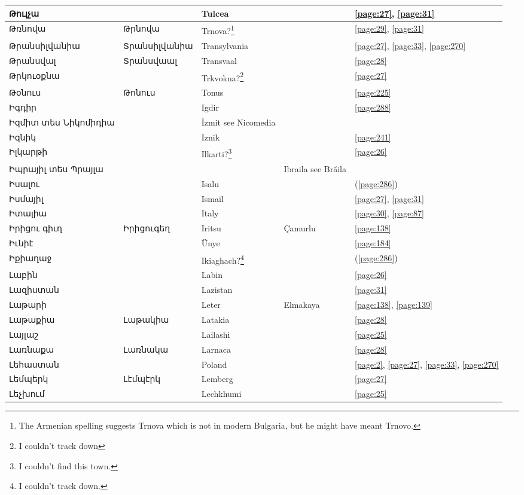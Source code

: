 \begin{center}
\begin{longtable}{|p{}|p{3cm}|p{3cm}|p{2cm}|p{3cm}|}
Թուլչա& & Tulcea& &\ref{page:27}, \ref{page:31}\\ \hline
Թռնովա& Թրնովա & Trnova?\footnote{The Armenian spelling suggests Trnova which is not in modern Bulgaria, but he might have meant Trnovo.}& &\ref{page:29}, \ref{page:31}\\ \hline
Թրանսիլվանիա&Տրանսիլվանիա
&Transylvania & &\ref{page:27}, \ref{page:33}, \ref{page:270}\\ \hline
Թրանսվալ&Տրանսվաալ & Transvaal& &\ref{page:28}\\ \hline
Թրկուօքնա& &Trkvokna?\footnote{I couldn't track down}& &\ref{page:27}\\ \hline
Թօնուս& Թոնուս& Tonus& &\ref{page:225}\\ \hline
Իգդիր& & Igdir& &\ref{page:288}\\ \hline
Իզմիտ տես Նիկոմիդիա& &İzmit see Nicomedia & &\\ \hline
Իզնիկ& & Iznik& &\ref{page:241}\\ \hline
Իլկարթի& &Ilkarti?\footnote{I couldn't find this town.} & &\ref{page:26}\\ \hline
Իպրայիլ տես Պրայլա& & &Ibraila see Brăila &\\ \hline
Իսալու& & Isalu& &(\ref{page:286})\\ \hline
Իսմայիլ& & Ismail& &\ref{page:27}, \ref{page:31}\\ \hline
Իտալիա& &Italy & &\ref{page:30}, \ref{page:87}\\ \hline
Իրիցու գիւղ& Իրիցուգեղ&Iritsu &Çamurlu &\ref{page:138}\\ \hline
Իւնիէ& & Ünye& &\ref{page:184}\\ \hline
Իքիաղաջ& &Ikiaghach?\footnote{I couldn't track down.} & &(\ref{page:286})\\ \hline
Լաբին& & Labin& &\ref{page:26}\\ \hline
Լազիստան& &Lazistan & &\ref{page:31}\\ \hline
Լաթարի& & Leter &Elmakaya &\ref{page:138}, \ref{page:139}\\ \hline
Լաթաքիա&   Լաթակիա & Latakia& &\ref{page:28}\\ \hline
Լայլաշ& & Lailashi& &\ref{page:25}\\ \hline
Լառնաքա& Լառնակա& Larnaca& &\ref{page:28}\\ \hline
Լեհաստան& &Poland & &\ref{page:2}, \ref{page:27}, \ref{page:33}, \ref{page:270}\\ \hline
Լեմպերկ& Լէմպէրկ& Lemberg& &\ref{page:27}\\ \hline
Լեչխում& &Lechkhumi & &\ref{page:25}\\ \hline

\end{longtable}
\end{center}
